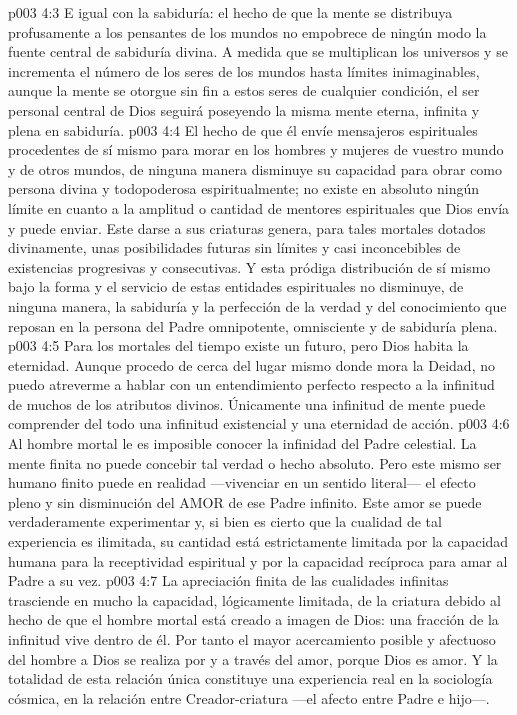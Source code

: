 \vs p003 4:3 E igual con la sabiduría: el hecho de que la mente se distribuya profusamente a los pensantes de los mundos no empobrece de ningún modo la fuente central de sabiduría divina. A medida que se multiplican los universos y se incrementa el número de los seres de los mundos hasta límites inimaginables, aunque la mente se otorgue sin fin a estos seres de cualquier condición, el ser personal central de Dios seguirá poseyendo la misma mente eterna, infinita y plena en sabiduría.
\vs p003 4:4 El hecho de que él envíe mensajeros espirituales procedentes de sí mismo para morar en los hombres y mujeres de vuestro mundo y de otros mundos, de ninguna manera disminuye su capacidad para obrar como persona divina y todopoderosa espiritualmente; no existe en absoluto ningún límite en cuanto a la amplitud o cantidad de mentores espirituales que Dios envía y puede enviar. Este darse a sus criaturas genera, para tales mortales dotados divinamente, unas posibilidades futuras sin límites y casi inconcebibles de existencias progresivas y consecutivas. Y esta pródiga distribución de sí mismo bajo la forma y el servicio de estas entidades espirituales no disminuye, de ninguna manera, la sabiduría y la perfección de la verdad y del conocimiento que reposan en la persona del Padre omnipotente, omnisciente y de sabiduría plena.
\vs p003 4:5 \pc Para los mortales del tiempo existe un futuro, pero Dios habita la eternidad. Aunque procedo de cerca del lugar mismo donde mora la Deidad, no puedo atreverme a hablar con un entendimiento perfecto respecto a la infinitud de muchos de los atributos divinos. Únicamente una infinitud de mente puede comprender del todo una infinitud existencial y una eternidad de acción.
\vs p003 4:6 \pc Al hombre mortal le es imposible conocer la infinidad del Padre celestial. La mente finita no puede concebir tal verdad o hecho absoluto. Pero este mismo ser humano finito puede en realidad  ---vivenciar en un sentido literal--- el efecto pleno y sin disminución del AMOR de ese Padre infinito. Este amor se puede verdaderamente experimentar y, si bien es cierto que la cualidad de tal experiencia es ilimitada, su cantidad está estrictamente limitada por la capacidad humana para la receptividad espiritual y por la capacidad recíproca para amar al Padre a su vez.
\vs p003 4:7 La apreciación finita de las cualidades infinitas trasciende en mucho la capacidad, lógicamente limitada, de la criatura debido al hecho de que el hombre mortal está creado a imagen de Dios: una fracción de la infinitud vive dentro de él. Por tanto el mayor acercamiento posible y afectuoso del hombre a Dios se realiza por y a través del amor, porque Dios es amor. Y la totalidad de esta relación única constituye una experiencia real en la sociología cósmica, en la relación entre Creador\hyp{}criatura ---el afecto entre Padre e hijo---.
